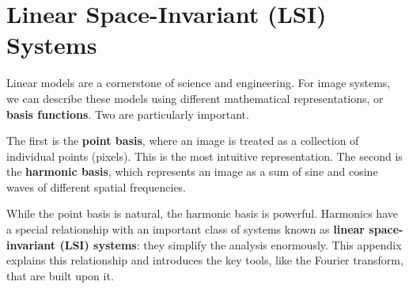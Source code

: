 \documentclass[
  letterpaper,
]{book}
\begin{document}
\chapter{Linear Space-Invariant (LSI)
Systems}\label{sec-appendix-spaceinvariance}

Linear models are a cornerstone of science and engineering. For image
systems, we can describe these models using different mathematical
representations, or \textbf{basis functions}. Two are particularly
important.

The first is the \textbf{point basis}, where an image is treated as a
collection of individual points (pixels). This is the most intuitive
representation. The second is the \textbf{harmonic basis}, which
represents an image as a sum of sine and cosine waves of different
spatial frequencies.

While the point basis is natural, the harmonic basis is powerful.
Harmonics have a special relationship with an important class of systems
known as \textbf{linear space-invariant (LSI) systems}: they simplify
the analysis enormously. This appendix explains this relationship and
introduces the key tools, like the Fourier transform, that are built
upon it.
\end{document}
